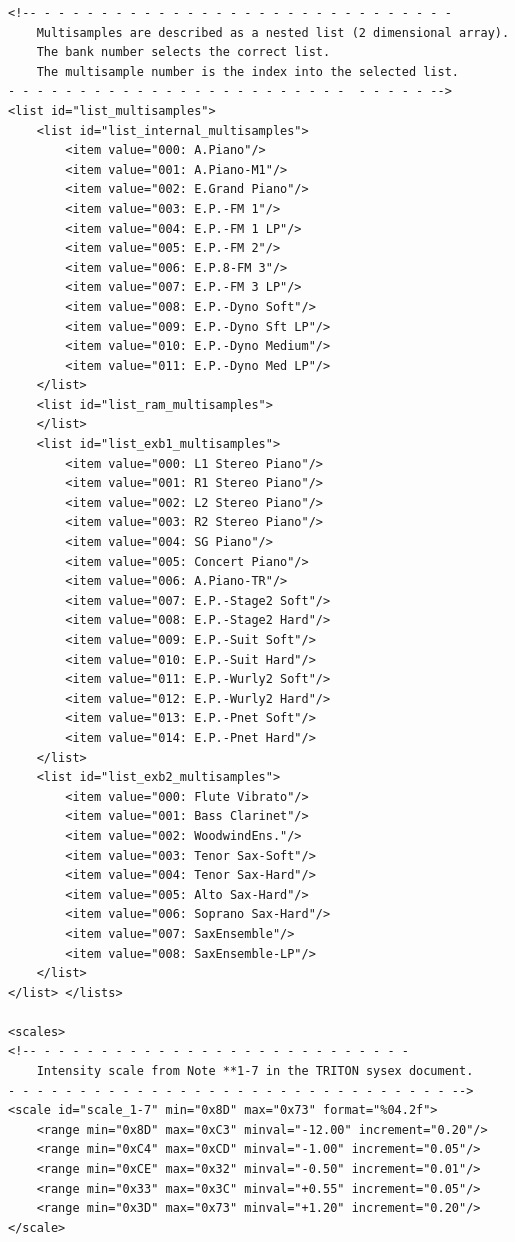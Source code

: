 \documentclass[a4paper,twoside,12pt]{article}
\begin{document}
\begin{verbatim}
<!-- - - - - - - - - - - - - - - - - - - - - - - - - - - - - -
    Multisamples are described as a nested list (2 dimensional array).
    The bank number selects the correct list.
    The multisample number is the index into the selected list.
- - - - - - - - - - - - - - - - - - - - - - - -  - - - - - -->
<list id="list_multisamples">
    <list id="list_internal_multisamples">
        <item value="000: A.Piano"/>
        <item value="001: A.Piano-M1"/>
        <item value="002: E.Grand Piano"/>
        <item value="003: E.P.-FM 1"/>
        <item value="004: E.P.-FM 1 LP"/>
        <item value="005: E.P.-FM 2"/>
        <item value="006: E.P.8-FM 3"/>
        <item value="007: E.P.-FM 3 LP"/>
        <item value="008: E.P.-Dyno Soft"/>
        <item value="009: E.P.-Dyno Sft LP"/>
        <item value="010: E.P.-Dyno Medium"/>
        <item value="011: E.P.-Dyno Med LP"/>
    </list>
    <list id="list_ram_multisamples">
    </list>
    <list id="list_exb1_multisamples">
        <item value="000: L1 Stereo Piano"/>
        <item value="001: R1 Stereo Piano"/>
        <item value="002: L2 Stereo Piano"/>
        <item value="003: R2 Stereo Piano"/>
        <item value="004: SG Piano"/>
        <item value="005: Concert Piano"/>
        <item value="006: A.Piano-TR"/>
        <item value="007: E.P.-Stage2 Soft"/>
        <item value="008: E.P.-Stage2 Hard"/>
        <item value="009: E.P.-Suit Soft"/>
        <item value="010: E.P.-Suit Hard"/>
        <item value="011: E.P.-Wurly2 Soft"/>
        <item value="012: E.P.-Wurly2 Hard"/>
        <item value="013: E.P.-Pnet Soft"/>
        <item value="014: E.P.-Pnet Hard"/>
    </list>
    <list id="list_exb2_multisamples">
        <item value="000: Flute Vibrato"/>
        <item value="001: Bass Clarinet"/>
        <item value="002: WoodwindEns."/>
        <item value="003: Tenor Sax-Soft"/>
        <item value="004: Tenor Sax-Hard"/>
        <item value="005: Alto Sax-Hard"/>
        <item value="006: Soprano Sax-Hard"/>
        <item value="007: SaxEnsemble"/>
        <item value="008: SaxEnsemble-LP"/>
    </list>
</list> </lists>

<scales>
<!-- - - - - - - - - - - - - - - - - - - - - - - - - - -
    Intensity scale from Note **1-7 in the TRITON sysex document.
- - - - - - - - - - - - - - - - - - - - - - - - - - - - - - - -->
<scale id="scale_1-7" min="0x8D" max="0x73" format="%04.2f">
    <range min="0x8D" max="0xC3" minval="-12.00" increment="0.20"/>
    <range min="0xC4" max="0xCD" minval="-1.00" increment="0.05"/>
    <range min="0xCE" max="0x32" minval="-0.50" increment="0.01"/>
    <range min="0x33" max="0x3C" minval="+0.55" increment="0.05"/>
    <range min="0x3D" max="0x73" minval="+1.20" increment="0.20"/>
</scale>


\end{verbatim}
\end{document}

